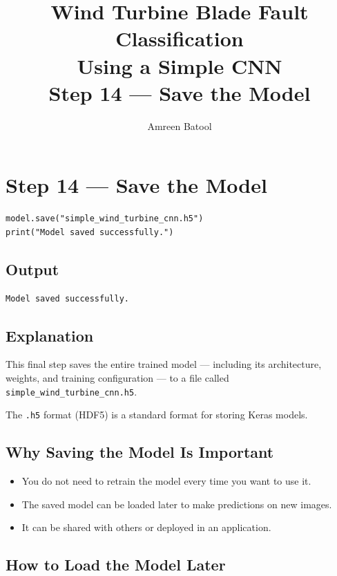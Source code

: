 \documentclass[12pt]{article}
\title{\textbf{Wind Turbine Blade Fault Classification\\Using a Simple CNN}\\[0.5em]
\large Step 14 --- Save the Model}
\author{Amreen Batool}
\date{}
\begin{document}
\maketitle

\section*{Step 14 --- Save the Model}

\begin{lstlisting}[style=pythonstyle]
model.save("simple_wind_turbine_cnn.h5")
print("Model saved successfully.")
\end{lstlisting}

\subsection*{Output}

\begin{lstlisting}[style=outputstyle]
Model saved successfully.
\end{lstlisting}

\subsection*{Explanation}

This final step saves the entire trained model --- including its architecture, weights, and training configuration --- to a file called \texttt{simple\_wind\_turbine\_cnn.h5}.

The \texttt{.h5} format (HDF5) is a standard format for storing Keras models.

\subsection*{Why Saving the Model Is Important}

\begin{itemize}
    \item You do not need to retrain the model every time you want to use it.
    \item The saved model can be loaded later to make predictions on new images.
    \item It can be shared with others or deployed in an application.
\end{itemize}

\subsection*{How to Load the Model Later}
\end{document}
